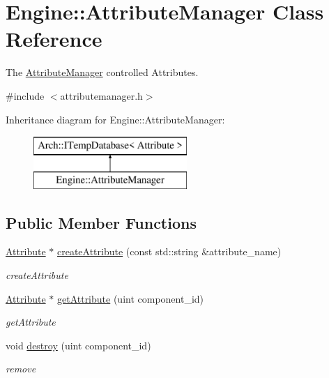 \hypertarget{classEngine_1_1AttributeManager}{}\section{Engine\+:\+:Attribute\+Manager Class Reference}
\label{classEngine_1_1AttributeManager}


The \hyperlink{classEngine_1_1AttributeManager}{Attribute\+Manager} controlled Attributes.  




{\ttfamily \#include $<$attributemanager.\+h$>$}

Inheritance diagram for Engine\+:\+:Attribute\+Manager\+:\begin{figure}[H]
\begin{center}
\leavevmode
\includegraphics[height=2.000000cm]{classEngine_1_1AttributeManager}
\end{center}
\end{figure}
\subsection*{Public Member Functions}
\begin{DoxyCompactItemize}
\item 
\hyperlink{classEngine_1_1Attribute}{Attribute} $\ast$ \hyperlink{classEngine_1_1AttributeManager_af7dd02d47b84f2f33bd8dac19052fe40}{create\+Attribute} (const std\+::string \&attribute\+\_\+name)
\begin{DoxyCompactList}\small\item\em create\+Attribute \end{DoxyCompactList}\item 
\hyperlink{classEngine_1_1Attribute}{Attribute} $\ast$ \hyperlink{classEngine_1_1AttributeManager_a792f0247b709578ea95bc08810b943f4}{get\+Attribute} (uint component\+\_\+id)
\begin{DoxyCompactList}\small\item\em get\+Attribute \end{DoxyCompactList}\item 
void \hyperlink{classEngine_1_1AttributeManager_aded6608e85127ef6e1c3edd21e31fe36}{destroy} (uint component\+\_\+id)
\begin{DoxyCompactList}\small\item\em remove \end{DoxyCompactList}\end{DoxyCompactItemize}



